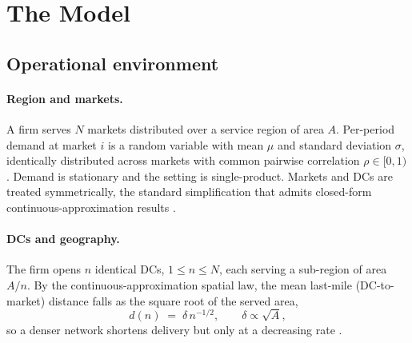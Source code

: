 \documentclass[11pt]{article}
\numberwithin{proposition}{section}
\theoremstyle{definition}
\theoremstyle{remark}
\theoremstyle{plain}
\begin{document}
\section{The Model}\label{sec:model}

\subsection{Operational environment}

\paragraph{Region and markets.} A firm serves $N$ markets distributed over a service region of area $A$.
Per-period demand at market $i$ is a random variable with mean $\mu$ and standard deviation $\sigma$,
identically distributed across markets with common pairwise correlation $\rho \in [0,1)$. Demand is
stationary and the setting is single-product. Markets and DCs are treated symmetrically, the standard
simplification that admits closed-form continuous-approximation results \citep{daganzo2005logistics}.

\paragraph{DCs and geography.} The firm opens $n$ identical DCs, $1 \le n \le N$, each
serving a sub-region of area $A/n$. By the continuous-approximation spatial law, the mean last-mile
(DC-to-market) distance falls as the square root of the served area,
\begin{equation}\label{eq:dn}
  d(n) \;=\; \delta\, n^{-1/2}, \qquad \delta \propto \sqrt{A},
\end{equation}
so a denser network shortens delivery but only at a decreasing rate \citep{daganzo2005logistics}.
\end{document}
